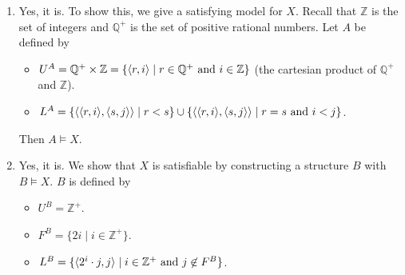 \begin{mdframed}[linewidth=1]
\begin{enumerate}
    \item Yes, it is. To show this, we give a satisfying model for $X$. Recall that $\mathbb{Z}$ is the set of integers and $\mathbb{Q}^+$ is the set of positive rational numbers. Let $A$ be defined by
    \begin{itemize}
    \item
    $U^A= \mathbb{Q}^+\times\mathbb{Z}=\{\mbox{$\langle r,i \rangle$}\mid r\in\mathbb{Q}^+\mbox{ and}\ i\in \mathbb{Z}\}$ (the cartesian product of $\mathbb{Q}^+$ and $\mathbb{Z}$).
    \item
    $L^A=\{\mbox{$\langle \mbox{$\langle r,i \rangle$},\mbox{$\langle s,j \rangle$} \rangle$}\mid r<s\}\cup\{\mbox{$\langle \mbox{$\langle r,i \rangle$},\mbox{$\langle s,j \rangle$} \rangle$}\mid r=s\mbox{ and }i<j\}$.
    \end{itemize}

    Then $A \models X$. 

    \item Yes, it is. We show that $X$ is satisfiable by constructing a structure $B$ with $B\models X$. $B$ is defined by
    \begin{itemize}
    \item
    $U^B= \mathbb{Z}^+$.
    \item
    $F^B=\{2i\mid i\in\mathbb{Z}^+\}$.
    \item
    $L^B = \{\mbox{$\langle 2^i\cdot j,j \rangle$}\mid i\in\mathbb{Z}^+\mbox{ and } j\not\in F^B\}$.
    \end{itemize}

\end{enumerate}
\end{mdframed}